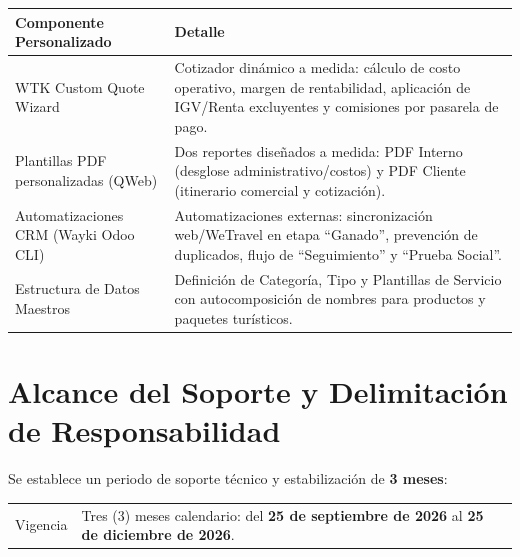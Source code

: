 \documentclass[10pt,a4paper]{article}
\begin{document}
\noindent
\begin{tabularx}{\linewidth}{|H|Y|}
\hline
{}
\bfseries\color{waykigreen}Componente Personalizado &
\bfseries\color{waykigreen}Detalle \\
\hline
WTK Custom Quote Wizard &
Cotizador dinámico a medida: cálculo de costo operativo, margen de rentabilidad, aplicación de IGV/Renta excluyentes y comisiones por pasarela de pago. \\
\hline
{}
Plantillas PDF personalizadas (QWeb) &
Dos reportes diseñados a medida: PDF Interno (desglose administrativo/costos) y PDF Cliente (itinerario comercial y cotización). \\
\hline
Automatizaciones CRM (Wayki Odoo CLI) &
Automatizaciones externas: sincronización web/WeTravel en etapa ``Ganado'', prevención de duplicados, flujo de ``Seguimiento'' y ``Prueba Social''. \\
\hline
{}
Estructura de Datos Maestros &
Definición de Categoría, Tipo y Plantillas de Servicio con autocomposición de nombres para productos y paquetes turísticos. \\
\hline
\end{tabularx}

\section{Alcance del Soporte y Delimitación de Responsabilidad}

Se establece un periodo de soporte técnico y estabilización de \textbf{3 meses}:

\noindent
\begin{tabularx}{\linewidth}{|G|Y|}
\hline
{}
 \\
\hline
Vigencia & Tres (3) meses calendario: del \textbf{25 de septiembre de 2026} al \textbf{25 de diciembre de 2026}. \\
\hline
\end{tabularx}
\end{document}

